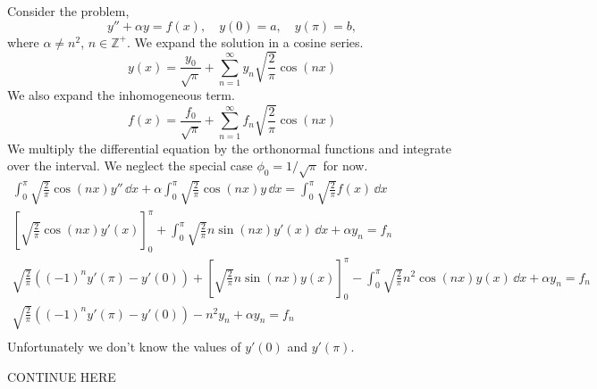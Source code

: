 \begin{Example}
  Consider the problem,
  \[
  y'' + \alpha y = f(x), \quad y(0) = a, \quad y(\pi) = b,
  \]
  where $\alpha \neq n^2$, $n \in \mathbb{Z}^+$.
  We expand the solution in a cosine series.
  \[
  y(x) = \frac{y_0}{\sqrt{\pi}} + \sum_{n = 1}^\infty y_n \sqrt{\frac{2}{\pi}} \cos(n x)
  \]
  We also expand the inhomogeneous term.
  \[
  f(x) = \frac{f_0}{\sqrt{\pi}} + \sum_{n = 1}^\infty f_n \sqrt{\frac{2}{\pi}} \cos(n x)
  \]
  We multiply the differential equation by the orthonormal functions
  and integrate over the interval.  
  We neglect the special case $\phi_0 = 1/\sqrt{\pi}$ for now.
  \begin{gather*}
    \int_0^\pi \sqrt{\frac{2}{\pi}} \cos(n x) y'' \,\dd x 
    + \alpha \int_0^\pi \sqrt{\frac{2}{\pi}} \cos(n x) y \,\dd x 
    = \int_0^\pi \sqrt{\frac{2}{\pi}} f(x) \,\dd x \\
    \left[ \sqrt{\frac{2}{\pi}} \cos(n x) y'(x) \right]_0^\pi
    + \int_0^\pi \sqrt{\frac{2}{\pi}} n \sin(n x) y'(x) \,\dd x 
    + \alpha y_n = f_n \\
    \sqrt{\frac{2}{\pi}} \left( (-1)^n y'(\pi) - y'(0) \right)
    + \left[ \sqrt{\frac{2}{\pi}} n \sin(n x) y(x) \right]_0^\pi
    - \int_0^\pi \sqrt{\frac{2}{\pi}} n^2 \cos(n x) y(x) \,\dd x 
    + \alpha y_n = f_n \\
    \sqrt{\frac{2}{\pi}} \left( (-1)^n y'(\pi) - y'(0) \right)
    - n^2 y_n + \alpha y_n = f_n \\
  \end{gather*}
  Unfortunately we don't know the values of $y'(0)$ and $y'(\pi)$.

  CONTINUE HERE
\end{Example}




















